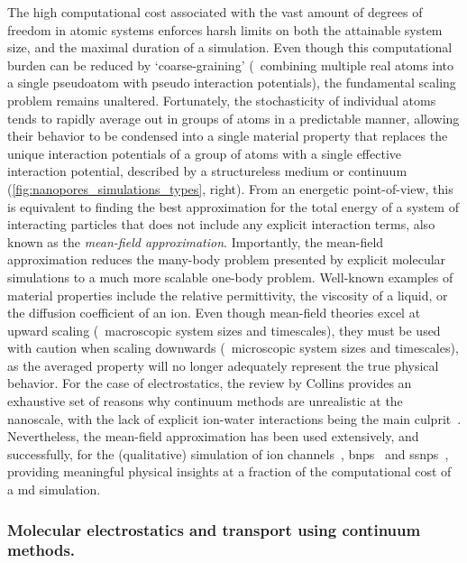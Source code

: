 The high computational cost associated with the vast amount of degrees of freedom in atomic systems enforces
harsh limits on both the attainable system size, and the maximal duration of a simulation. Even though this
computational burden can be reduced by `coarse-graining' (\ie~combining multiple real atoms into a single
pseudoatom with pseudo interaction potentials), the fundamental scaling problem remains unaltered.
Fortunately, the stochasticity of individual atoms tends to rapidly average out in groups of atoms in a
predictable manner, allowing their behavior to be condensed into a single material property that replaces the
unique interaction potentials of a group of atoms with a single effective interaction potential, described by
a structureless medium or continuum (\cref{fig:nanopores_simulations_types}, right). From an energetic
point-of-view, this is equivalent to finding the best approximation for the total energy of a system of
interacting particles that does not include any explicit interaction terms, also known as the \emph{mean-field
approximation}. Importantly, the mean-field approximation reduces the many-body problem presented by explicit
molecular simulations to a much more scalable one-body problem. Well-known examples of material properties
include the relative permittivity, the viscosity of a liquid, or the diffusion coefficient of an ion. Even
though mean-field theories excel at upward scaling (\ie~macroscopic system sizes and timescales), they must be
used with caution when scaling downwards (\ie~microscopic system sizes and timescales), as the averaged
property will no longer adequately represent the true physical behavior. For the case of electrostatics, the
review by Collins provides an exhaustive set of reasons why continuum methods are unrealistic at the
nanoscale, with the lack of explicit ion-water interactions being the main culprit~\cite{Collins-2012}.
Nevertheless, the mean-field approximation has been used extensively, and successfully, for the (qualitative)
simulation of ion channels~\cite{Im-2002,Furini-2006,Liu-2015},
\glspl{bnp}~\cite{Simakov-2010,Pederson-2015,Aguilella-Arzo-2017,Simakov-2018} and
\glspl{ssnp}~\cite{Cervera-2005,White-2008,Chaudhry-2014,Laohakunakorn-2015}, providing meaningful physical
insights at a fraction of the computational cost of a \gls{md} simulation.


\subsubsection{Molecular electrostatics and transport using continuum methods.}
%

